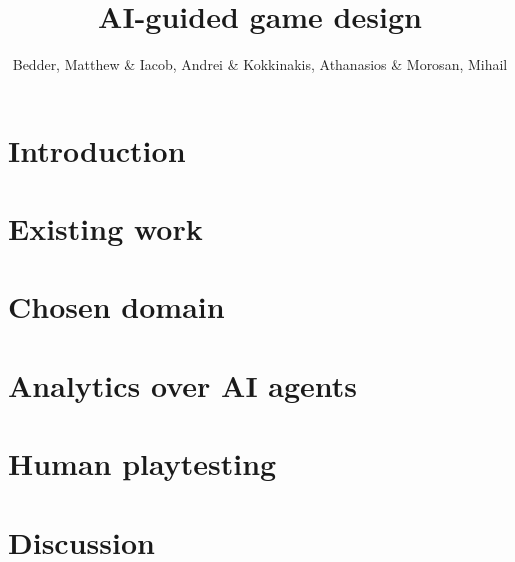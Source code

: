 \documentclass[9pt]{IEEEtran}
\title{AI-guided game design}
\author{Bedder, Matthew \& Iacob, Andrei \& Kokkinakis, Athanasios \& Morosan, Mihail}
\begin{document}
\maketitle
\section{Introduction}

\section{Existing work}

\section{Chosen domain}

\section{Analytics over AI agents}

\section{Human playtesting}

\section{Discussion}

\end{document}
